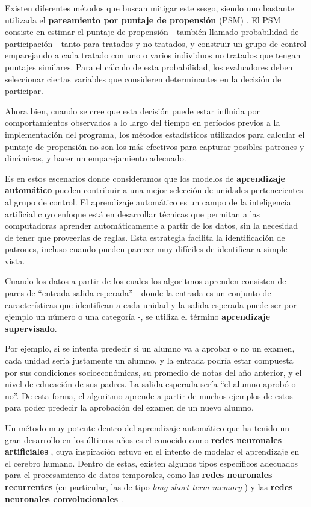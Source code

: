 \documentclass[../main.tex]{subfiles}
\begin{document}
Existen diferentes métodos que buscan mitigar este sesgo, siendo uno bastante utilizada el
\textbf{pareamiento por puntaje de propensión} (PSM)
\cite{psm1983}\cite{a-primer-for-applying-psm}. El PSM consiste en estimar el puntaje de
propensión - también llamado probabilidad de participación - tanto para tratados y no
tratados, y construir un grupo de control emparejando a cada tratado con uno o varios
individuos no tratados que tengan puntajes similares. Para el cálculo de esta
probabilidad, los evaluadores deben seleccionar ciertas variables que consideren
determinantes en la decisión de participar.

Ahora bien, cuando se cree que esta decisión puede estar influida por comportamientos
observados a lo largo del tiempo en períodos previos a la implementación del programa, los
métodos estadísticos utilizados para calcular el puntaje de propensión no son los más
efectivos para capturar posibles patrones y dinámicas, y hacer un emparejamiento adecuado.

Es en estos escenarios donde consideramos que los modelos de \textbf{aprendizaje
automático} \cite{deep-learning}\cite{ai-a-modern-approach} pueden contribuir a una mejor
selección de unidades pertenecientes al grupo de control. El aprendizaje automático es un
campo de la inteligencia artificial cuyo enfoque está en desarrollar técnicas que permitan
a las computadoras aprender automáticamente a partir de los datos, sin la necesidad de
tener que proveerlas de reglas. Esta estrategia facilita la identificación de patrones,
incluso cuando pueden parecer muy difíciles de identificar a simple vista.

Cuando los datos a partir de los cuales los algoritmos aprenden consisten de pares de
``entrada-salida esperada'' - donde la entrada es un conjunto de características que
identifican a cada unidad y la salida esperada puede ser por ejemplo un número o una
categoría -, se utiliza el término \textbf{aprendizaje supervisado}.

Por ejemplo, si se intenta predecir si un alumno va a aprobar o no un examen, cada unidad
sería justamente un alumno, y la entrada podría estar compuesta por sus condiciones
socioeconómicas, su promedio de notas del año anterior, y el nivel de educación de sus
padres. La salida esperada sería ``el alumno aprobó o no''. De esta forma, el algoritmo
aprende a partir de muchos ejemplos de estos para poder predecir la aprobación del examen
de un nuevo alumno.

Un método muy potente dentro del aprendizaje automático que ha tenido un gran desarrollo
en los últimos años es el conocido como \textbf{redes neuronales artificiales}
\cite{nielsen}, cuya inspiración estuvo en el intento de modelar el aprendizaje en el
cerebro humano. Dentro de estas, existen algunos tipos específicos adecuados para el
procesamiento de datos temporales, como las \textbf{redes neuronales recurrentes} (en
particular, las de tipo \textit{long short-term memory}\cite{lstm-paper-1997} ) y las
\textbf{redes neuronales convolucionales} \cite{prince2024understanding}.
\end{document}
